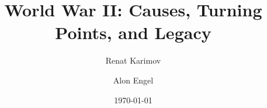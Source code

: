 \title{World War II: Causes, Turning Points, and Legacy}
\newcommand{\BookTitle}{World War II: Causes, Turning Points, and Legacy}
\author{Renat Karimov \and Alon Engel}
\date{\today}
